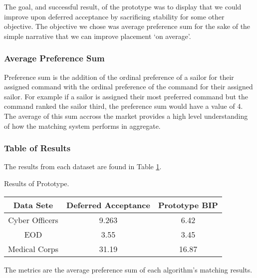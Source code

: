 The goal, and successful result, of the prototype was to display that we could improve upon deferred acceptance by sacrificing stability for some other objective. The objective we chose was average preference sum for the sake of the simple narrative that we can improve placement `on average'.

\subsubsection{Average Preference Sum}
\label{pref_sum}
Preference sum is the addition of the ordinal preference of a sailor for their assigned command with the ordinal preference of the command for their assigned sailor. For example if a sailor is assigned their most preferred command but the command ranked the sailor third, the preference sum would have a value of 4. The average of this sum accross the market provides a high level understanding of how the matching system performs in aggregate.

\subsubsection{Table of Results}

The results from each dataset are found in Table \ref{tab1}.

\begin{table}[h]
\TABLE
{Results of Prototype.\label{tab1}}
{\begin{tabular}{ |c||c|c|  }
 \hline
 Data Sete & Deferred Acceptance &Prototype BIP\\
 \hline
 Cyber Officers  & 9.263   & 6.42 \\
 EOD  & 3.55   & 3.45\\
 Medical Corps  & 31.19   & 16.87\\
 \hline
\end{tabular}}
{The metrics are the average preference sum of each algorithm's matching results.}
\end{table}
